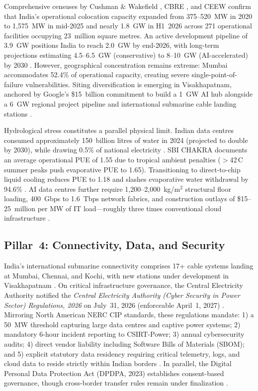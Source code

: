 \documentclass[conference]{IEEEtran}
\begin{document}
Comprehensive censuses by Cushman \& Wakefield \cite{cushman2026h1}, CBRE \cite{cbre2026indiadc}, and CEEW \cite{ceew2026datacentre} confirm that India's operational colocation capacity expanded from 375--520~MW in 2020 to 1{,}575~MW in mid-2025 and nearly 1.8~GW in H1~2026 across 271 operational facilities occupying 23~million square metres. An active development pipeline of 3.9~GW positions India to reach 2.0~GW by end-2026, with long-term projections estimating 4.5--6.5~GW (conservative) to 8--10~GW (AI-accelerated) by 2030 \cite{ceew2026datacentre,fsr2026powergrid}. However, geographical concentration remains extreme: Mumbai accommodates 52.4\% of operational capacity, creating severe single-point-of-failure vulnerabilities. Siting diversification is emerging in Visakhapatnam, anchored by Google's \$15~billion commitment to build a 1~GW AI hub alongside a 6~GW regional project pipeline and international submarine cable landing stations \cite{fsr2026powergrid}.

Hydrological stress constitutes a parallel physical limit. Indian data centres consumed approximately 150~billion litres of water in 2024 (projected to double by 2030), while drawing 0.5\% of national electricity \cite{ceew2026datacentre}. SBI CHAKRA \cite{sbicap2025datacentre} documents an average operational PUE of 1.55 due to tropical ambient penalties ($>$42\,\textdegree C summer peaks push evaporative PUE to 1.65). Transitioning to direct-to-chip liquid cooling reduces PUE to 1.18 and slashes evaporative water withdrawal by 94.6\% \cite{ieeetcpmt2026cooling}. AI data centres further require 1{,}200--2{,}000~kg/m$^2$ structural floor loading, 400~Gbps to 1.6~Tbps network fabrics, and construction outlays of \$15--25~million per MW of IT load---roughly three times conventional cloud infrastructure \cite{cushman2026h1}.

\subsection{Pillar~4: Connectivity, Data, and Security}

India's international submarine connectivity comprises 17+ cable systems landing at Mumbai, Chennai, and Kochi, with new stations under development in Visakhapatnam \cite{trai2026connectivity,fsr2026powergrid}. On critical infrastructure governance, the Central Electricity Authority notified the \textit{Central Electricity Authority (Cyber Security in Power Sector) Regulations, 2026} on July~31, 2026 (enforceable April~1, 2027) \cite{cea2026cybersec,denexus2026otcyber}. Mirroring North American NERC CIP standards, these regulations mandate: 1) a 50~MW threshold capturing large data centres and captive power systems; 2) mandatory 6-hour incident reporting to CSIRT-Power; 3) annual cybersecurity audits; 4) direct vendor liability including Software Bills of Materials (SBOM); and 5) explicit statutory data residency requiring critical telemetry, logs, and cloud data to reside strictly within Indian borders \cite{denexus2026otcyber}. In parallel, the Digital Personal Data Protection Act (DPDPA, 2023) establishes consent-based governance, though cross-border transfer rules remain under finalization \cite{meity2023dpdpa}.
\end{document}
